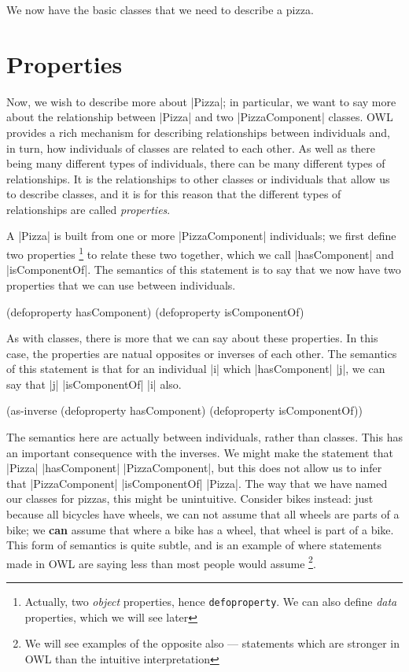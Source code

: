 We now have the basic classes that we need to describe a pizza.

\section{Properties}
\label{sec:properties}

Now, we wish to describe more about |Pizza|; in particular, we want to say
more about the relationship between |Pizza| and two |PizzaComponent| classes.
OWL provides a rich mechanism for describing relationships between individuals
and, in turn, how individuals of classes are related to each other. As well as
there being many different types of individuals, there can be many
different types of relationships. It is the relationships to other classes or
individuals that allow us to describe classes, and it is for this reason that
the different types of relationships are called \emph{properties}.

A |Pizza| is built from one or more |PizzaComponent| individuals; we first
define two properties \footnote{Actually, two \emph{object} properties, hence
  \lstinline|defoproperty|. We can also define \emph{data} properties, which
  we will see later} to relate these two together, which we call
|hasComponent| and |isComponentOf|. The semantics of this statement is to say
that we now have two properties that we can use between individuals.

\begin{tawnyhidden}
(defoproperty hasComponent)
(defoproperty isComponentOf)
\end{tawnyhidden}

As with classes, there is more that we can say about these properties. In this
case, the properties are natual opposites or inverses of each other. The
semantics of this statement is that for an individual |i| which |hasComponent|
|j|, we can say that |j| |isComponentOf| |i| also. 

\begin{tawny}
(as-inverse
 (defoproperty hasComponent)
 (defoproperty isComponentOf))
\end{tawny}

The semantics here are actually between individuals, rather than
classes. This has an important consequence with the inverses. We might
make the statement that |Pizza| |hasComponent| |PizzaComponent|, but
this does not allow us to infer that |PizzaComponent| |isComponentOf|
|Pizza|. The way that we have named our classes for pizzas, this might
be unintuitive. Consider bikes instead: just because all bicycles have
wheels, we can not assume that all wheels are parts of a bike; we
\textbf{can} assume that where a bike has a wheel, that wheel is part
of a bike. This form of semantics is quite subtle, and is an example
of where statements made in OWL are saying less than most people would
assume \footnote{We will see examples of the opposite also ---
  statements which are stronger in OWL than the intuitive
  interpretation}.

